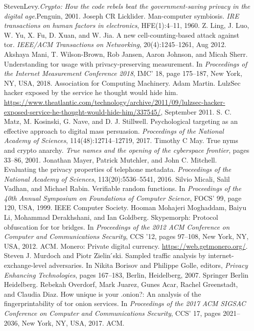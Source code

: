 \documentclass{article}
\begin{document}
\begin{thebibliography}{200}
StevenLevy.\emph{Crypto: How the code rebels beat the government-saving privacy in the digital age}.Penguin, 2001.
Joseph CR Licklider. Man-computer symbiosis. \emph{IRE transactions on human factors in electronics}, HFE(1):4–11, 1960.
Z. Ling, J. Luo, W. Yu, X. Fu, D. Xuan, and W. Jia. A new cell-counting-based attack against tor. \emph{IEEE/ACM Transactions on Networking}, 20(4):1245–1261, Aug 2012.
Akshaya Mani, T. Wilson-Brown, Rob Jansen, Aaron Johnson, and Micah Sherr. Understanding tor usage with privacy-preserving measurement. In \emph{Proceedings of the Internet Measurement Conference 2018}, IMC' 18, page 175–187, New York, NY, USA, 2018. Association for Computing Machinery.
Adam Martin. LulzSec hacker exposed by the service he thought would hide him. \url{https://www.theatlantic.com/technology/archive/2011/09/lulzsec-hacker-exposed-service-he-thought-would-hide-him/337545/}, September 2011.
S. C. Matz, M. Kosinski, G. Nave, and D. J. Stillwell. Psychological targeting as an effective approach to digital mass persuasion. \emph{Proceedings of the National Academy of Sciences}, 114(48):12714–12719, 2017.
Timothy C May. True nyms and crypto anarchy. \emph{True names and the opening of the cyberspace frontier}, pages 33–86, 2001.
Jonathan Mayer, Patrick Mutchler, and John C. Mitchell. Evaluating the privacy properties of telephone metadata. \emph{Proceedings of the National Academy of Sciences}, 113(20):5536–5541, 2016.
Silvio Micali, Salil Vadhan, and Michael Rabin. Verifiable random functions. In \emph{Proceedings of the 40th Annual Symposium on Foundations of Computer Science}, FOCS' 99, page 120, USA, 1999. IEEE Computer Society.
Hooman Mohajeri Moghaddam, Baiyu Li, Mohammad Derakhshani, and Ian Goldberg. Skypemorph: Protocol obfuscation for tor bridges. In \emph{Proceedings of the 2012 ACM Conference on Computer and Communications Security}, CCS ’12, pages 97–108, New York, NY, USA, 2012. ACM.
Monero: Private digital currency. \url{https://web.getmonero.org/}.
Steven J. Murdoch and Piotr Zielin ́ski. Sampled traffic analysis by internet-exchange-level adversaries. In Nikita Borisov and Philippe Golle, editors, \emph{Privacy Enhancing Technologies}, pages 167–183, Berlin, Heidelberg, 2007. Springer Berlin Heidelberg.
Rebekah Overdorf, Mark Juarez, Gunes Acar, Rachel Greenstadt, and Claudia Diaz. How unique is your .onion?: An analysis of the fingerprintability of tor onion services. In \emph{Proceedings of the 2017 ACM SIGSAC Conference on Computer and Communications Security}, CCS’ 17, pages 2021–2036, New York, NY, USA, 2017. ACM.

\end{thebibliography}
\end{document}
